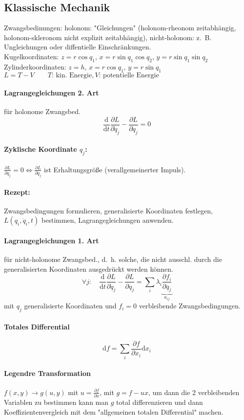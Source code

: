 \documentclass[a4paper, 11pt, fleqn]{article}
\newcommand{\md}{\mathrm{d}}
\newcommand{\pd}[2]{\frac{\partial #1}{\partial #2}}
\newcommand{\ad}[2]{\frac{\md #1}{\md #2}}
\begin{document}
\begin{multicols}{2}
\section{Klassische Mechanik}
Zwangsbedinungen: holonom: "Gleichungen" (holonom-rheonom zeitabhängig, holonom-skleronom nicht explizit zeitabhängig), nicht-holonom: z.~B. Ungleichungen oder diffentielle Einschränkungen.\\
Kugelkoordinaten: $z=r\cos q_1$, $x=r\sin q_1\cos q_2$, $y=r\sin q_1\sin q_2$\\
Zylinderkoordinaten: $z=h$, $x=r\cos q_1$, $y=r\sin q_1$\\
$L=T-V \qquad T\text{: kin. Energie}, V\text{: potentielle Energie}$\\
\paragraph{Lagrangegleichungen 2. Art} für holonome Zwangsbed.
\[\ad{}{t} \pd{L}{\dot q_j} - \pd{L}{q_j}=0\]
\paragraph{Zyklische Koordinate $q_j$:} $\pd{L}{q_j} = 0 \Leftrightarrow \pd{L}{\dot q_j}$ ist Erhaltungsgröße (verallgemeinerter Impuls).
\paragraph{Rezept:} Zwangsbedingungen formulieren, generalisierte Koordinaten festlegen, $L(q_i, \dot q_i, t)$ bestimmen, Lagrangegleichungen anwenden.

\paragraph{Lagrangegleichungen 1. Art} für nicht-holonome Zwangsbed., d.~h. solche, die nicht ausschl. durch die generalisierten Koordinaten ausgedrückt werden können.
\[\forall j: \quad \ad{}{t} \pd{L}{\dot q_j} - \pd{L}{q_j} = \sum\limits_i \lambda_i \underbrace{\pd{f_i}{q_j}}_{a_{ij}}\]
mit $q_j$ generalisierte Koordinaten und $f_i=0$ verbleibende Zwangsbedingungen.

\paragraph{Totales Differential} \[\md f = \sum_i \pd{f}{x_i} \md x_i\]

\paragraph{Legendre Transformation} $f(x,y) \to g(u,y)$ mit $u = \pd{f}{x} $, mit $g=f-ux$, um dann die 2 verbleibenden Variablen zu bestimmen kann man $g$ total differenzieren und dann Koeffizientenvergleich mit dem "allgemeinen totalen Differential" machen.


\end{multicols}
\end{document}
